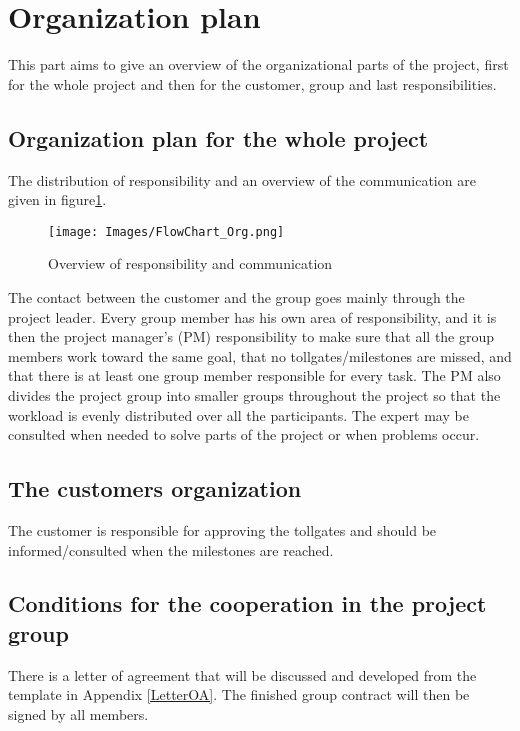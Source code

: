 \section{Organization plan} %
This part aims to give an overview of the organizational parts of the project, first for the whole project and then for the customer, group and last responsibilities.
\subsection{Organization plan for the whole project}
The distribution of responsibility and an overview of the communication are given in figure\ref{FlowOrg}.
\begin{figure}[h]
	\centering
		\texttt{[image: Images/FlowChart\_Org.png]}
		\caption{Overview of responsibility and communication}
		\label{FlowOrg}
\end{figure}
The contact between the customer and the group goes mainly through the project leader. Every group member has his own area of responsibility, and it is then the project manager’s (PM) responsibility to make sure that all the group members work toward the same goal, that no tollgates/milestones are missed, and that there is at least one group member responsible for every task. The PM also divides the project group into smaller groups throughout the project so that the workload is evenly distributed over all the participants. The expert may be consulted when needed to solve parts of the project or when problems occur.
\subsection{The customers organization}
The customer is responsible for approving the tollgates and should be informed/consulted when the milestones are reached.
\subsection{Conditions for the cooperation in the project group}
There is a letter of agreement that will be discussed and developed from the template in Appendix \ref{LetterOA}. The finished group contract will then be signed by all members.
